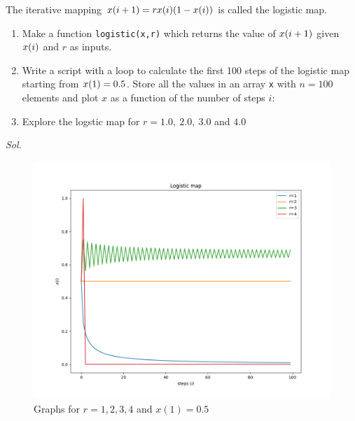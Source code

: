     \begin{problem}\label{problem_2.8}
        The iterative mapping $x\qty(i+1)=rx\qty(i) \qty(1-x\qty(i))$ is called the logistic map.
        \begin{enumerate}
            \item Make a function \verb|logistic(x,r)| which returns the value of $x\qty(i+1)$ given $x\qty(i)$ and $r$ as inputs.
            \item Write a script with a loop to calculate the first 100 steps of the logistic map starting from $x\qty(1)=0.5$. Store all the values in an array \verb|x| with $n=100$ elements and plot $x$ as a function of the number of steps $i$:
            \item Explore the logstic map for $r=1.0, \ 2.0, \ 3.0$ and $4.0$
        \end{enumerate}
    \end{problem}
    \textit{ Sol. }
    
    \begin{figure}[h!]
        \centering
        \includegraphics[width=0.65\linewidth]{img/chapter2/2-8/2_8_logistic_map.png}
        \caption{Graphs for $r=1,2,3,4$ and $x(1)=0.5$}
        \label{fig:problem 2-8}
    \end{figure}
    


